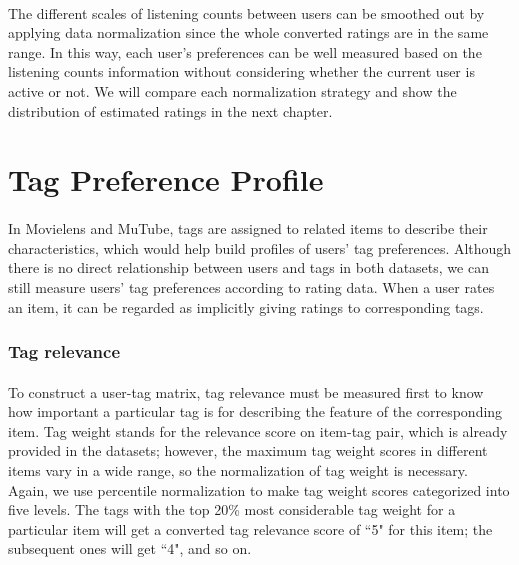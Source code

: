 \documentclass[a4paper,12pt]{report}
\begin{document}
\paragraph{}
The different scales of listening counts between users can be smoothed out by applying data normalization since the whole converted ratings are in the same range. In this way, each user's preferences can be well measured based on the listening counts information without considering whether the current user is active or not. We will compare each normalization strategy and show the distribution of estimated ratings in the next chapter.

\section{Tag Preference Profile}
\paragraph{}
In Movielens and MuTube, tags are assigned to related items to describe their characteristics, which would help build profiles of users' tag preferences. Although there is no direct relationship between users and tags in both datasets, we can still measure users' tag preferences according to rating data. When a user rates an item, it can be regarded as implicitly giving ratings to corresponding tags. 
\subsubsection{Tag relevance}
\paragraph{}
To construct a user-tag matrix, tag relevance must be measured first to know how important a particular tag is for describing the feature of the corresponding item. Tag weight stands for the relevance score on item-tag pair, which is already provided in the datasets; however, the maximum tag weight scores in different items vary in a wide range, so the normalization of tag weight is necessary. Again, we use percentile normalization to make tag weight scores categorized into five levels. The tags with the top 20\% most considerable tag weight for a particular item will get a converted tag relevance score of ``5" for this item; the subsequent ones will get ``4", and so on.

\end{document}
